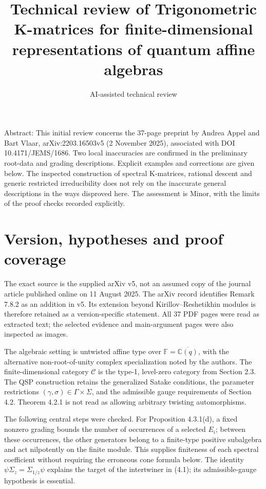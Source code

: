 \documentclass[10pt]{article}
\title{Technical review of
Trigonometric K-matrices for finite-dimensional representations of quantum affine algebras}
\author{AI-assisted technical review}
\date{}
\begin{document}
\maketitle
Abstract: This initial review concerns the 37-page preprint by Andrea Appel and Bart Vlaar, arXiv:2203.16503v5 (2 November 2025), associated with DOI 10.4171/JEMS/1686. Two local inaccuracies are confirmed in the preliminary root-data and grading descriptions. Explicit examples and corrections are given below. The inspected construction of spectral K-matrices, rational descent and generic restricted irreducibility does not rely on the inaccurate general descriptions in the ways disproved here. The assessment is Minor, with the limits of the proof checks recorded explicitly.\par
\section*{Version, hypotheses and proof coverage}
The exact source is the supplied arXiv v5, not an assumed copy of the journal article published online on 11 August 2025. The arXiv record identifies Remark 7.8.2 as an addition in v5. Its extension beyond Kirillov–Reshetikhin modules is therefore retained as a version-specific statement. All 37 PDF pages were read as extracted text; the selected evidence and main-argument pages were also inspected as images.\par
The algebraic setting is untwisted affine type over \(\mathbb F=\overline{\mathbb C(q)}\), with the alternative non-root-of-unity complex specialization noted by the authors. The finite-dimensional category \(\mathcal C\) is the type-1, level-zero category from Section 2.3. The QSP construction retains the generalized Satake conditions, the parameter restrictions \((\gamma,\sigma)\in\Gamma\times\Sigma\), and the admissible gauge requirements of Section 4.2. Theorem 4.2.1 is not read as allowing arbitrary twisting automorphisms.\par
The following central steps were checked. For Proposition 4.3.1(d), a fixed nonzero grading bounds the number of occurrences of a selected \(E_i\); between these occurrences, the other generators belong to a finite-type positive subalgebra and act nilpotently on the finite module. This supplies finiteness of each spectral coefficient without requiring the erroneous cone formula below. The identity \(\psi\Sigma_z=\Sigma_{1/z}\psi\) explains the target of the intertwiner in (4.1); its admissible-gauge hypothesis is essential.\par
\end{document}
